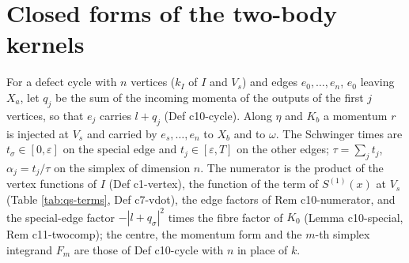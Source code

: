 \section{Closed forms of the two-body kernels}
\label{sec:qs-closed}

\begin{definition}
\label{def:qs-cycle}
For a defect cycle with $n$ vertices ($k_I$ of $I$ and $V_s$) and edges $e_0,\dots,e_n$, $e_0$ leaving $X_a$, let $q_j$ be the sum of the incoming momenta of the outputs of the first $j$ vertices, so that $e_j$ carries $l+q_j$ (Def c10-cycle). Along $\eta$ and $K_b$ a momentum $r$ is injected at $V_s$ and carried by $e_s,\dots,e_n$ to $X_b$ and to $\omega$. The Schwinger times are $t_\sigma\in[0,\varepsilon]$ on the special edge and $t_j\in[\varepsilon,T]$ on the other edges; $\tau=\sum_jt_j$, $\alpha_j=t_j/\tau$ on the simplex of dimension $n$. The numerator is the product of the vertex functions of $I$ (Def c1-vertex), the function of the term of $S^{(1)}(x)$ at $V_s$ (Table \ref{tab:qs-terms}, Def c7-vdot), the edge factors of Rem c10-numerator, and the special-edge factor $-|l+q_\sigma|^2$ times the fibre factor of $K_0$ (Lemma c10-special, Rem c11-twocomp); the centre, the momentum form and the $m$-th simplex integrand $F_m$ are those of Def c10-cycle with $n$ in place of $k$.
\end{definition}

